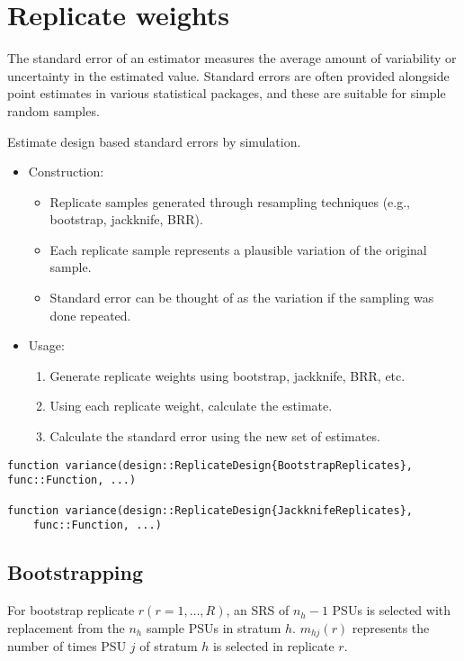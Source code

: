 \documentclass{juliacon}
\begin{document}
\section{Replicate weights}

The standard error of an estimator measures the average amount of variability or uncertainty in the estimated value. Standard errors are often provided alongside point estimates in various statistical packages, and these are suitable for simple random samples.

Estimate design based standard errors by simulation. 
    \begin{itemize}
        \item Construction:
            \begin{itemize}
                \item Replicate samples generated through resampling techniques (e.g., bootstrap, jackknife, BRR).
                \item Each replicate sample represents a plausible variation of the original sample.
                \item Standard error can be thought of as the variation if the sampling was done repeated. 
            \end{itemize}
        \item Usage:
            \begin{enumerate}
                \item Generate replicate weights using bootstrap, jackknife, BRR, etc. 
                \item Using each replicate weight, calculate the estimate. 
                \item Calculate the standard error using the new set of estimates. 
            \end{enumerate}
        \end{itemize}

\begin{lstlisting}
function variance(design::ReplicateDesign{BootstrapReplicates},
func::Function, ...)

function variance(design::ReplicateDesign{JackknifeReplicates},
    func::Function, ...)
\end{lstlisting}

\subsection{Bootstrapping}

For bootstrap replicate $r (r = 1, \dots, R)$, an SRS of $n_h - 1$ PSUs is selected with replacement from the $n_h$ sample PSUs in stratum $h$. $m_{hj}(r)$ represents the number of times PSU $j$ of stratum $h$ is selected in replicate $r$.
\end{document}
